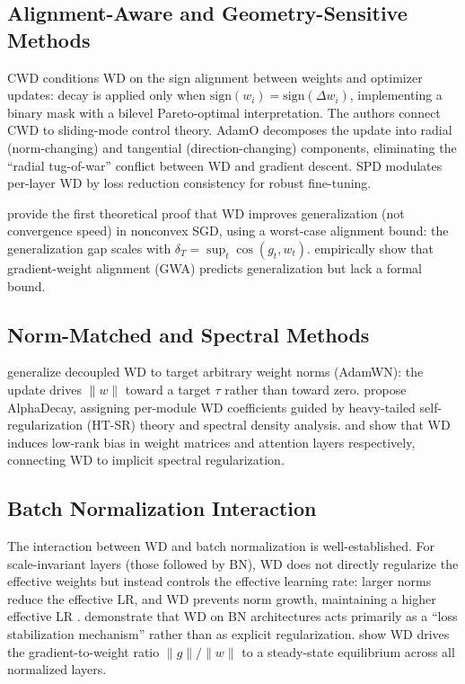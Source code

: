 \documentclass{article}
\begin{document}
\subsection{Alignment-Aware and Geometry-Sensitive Methods}

CWD \citep{chen2026cwd} conditions WD on the sign alignment between weights and optimizer updates: decay is applied only when $\text{sign}(w_i) = \text{sign}(\Delta w_i)$, implementing a binary mask with a bilevel Pareto-optimal interpretation. The authors connect CWD to sliding-mode control theory. AdamO \citep{chen2026adamo} decomposes the update into radial (norm-changing) and tangential (direction-changing) components, eliminating the ``radial tug-of-war'' conflict between WD and gradient descent. SPD \citep{tian2024spd} modulates per-layer WD by loss reduction consistency for robust fine-tuning.

\citet{sun2025wd_generalization} provide the first theoretical proof that WD improves generalization (not convergence speed) in nonconvex SGD, using a worst-case alignment bound: the generalization gap scales with $\delta_T = \sup_t \cos(g_t, w_t)$. \citet{holzl2025gwa} empirically show that gradient-weight alignment (GWA) predicts generalization but lack a formal bound.

\subsection{Norm-Matched and Spectral Methods}

\citet{loshchilov2023adamwn} generalize decoupled WD to target arbitrary weight norms (AdamWN): the update drives $\|w\|$ toward a target $\tau$ rather than toward zero. \citet{he2025alphadecay} propose AlphaDecay, assigning per-module WD coefficients guided by heavy-tailed self-regularization (HT-SR) theory and spectral density analysis. \citet{galanti2022implicit} and \citet{kobayashi2024spectral} show that WD induces low-rank bias in weight matrices and attention layers respectively, connecting WD to implicit spectral regularization.

\subsection{Batch Normalization Interaction}

The interaction between WD and batch normalization is well-established. For scale-invariant layers (those followed by BN), WD does not directly regularize the effective weights but instead controls the effective learning rate: larger norms reduce the effective LR, and WD prevents norm growth, maintaining a higher effective LR \citep{kosson2023bn_wd}. \citet{dangelo2024bn_wd} demonstrate that WD on BN architectures acts primarily as a ``loss stabilization mechanism'' rather than as explicit regularization. \citet{defazio2025steady_state} show WD drives the gradient-to-weight ratio $\|g\|/\|w\|$ to a steady-state equilibrium across all normalized layers.
\end{document}
